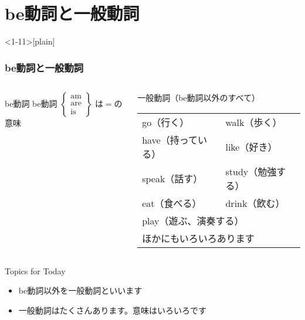 \documentclass[aspectratio=169]{beamer}
\begin{document}
\section{be動詞と一般動詞}
\begin{frame}<1-11>[plain]\frametitle{be動詞と一般動詞}

\begin{columns}
\begin{column}[t]{.38\textwidth}
\begin{block}{be動詞}
be動詞
{\footnotesize
$
 \left\{
\begin{array}{l}
\text{am}\\
\text{are}\\
\text{is}
\end{array}\right\}
$
}
は$=$の意味
\end{block}
\end{column}
\pause
\begin{column}[t]{.52\textwidth}
\begin{block}{一般動詞（be動詞以外のすべて）}
\begin{tabular}[t]{ll}
go（行く）&walk（歩く）\pause\\
have（持っている）&like（好き）\pause\\
speak（話す）&study（勉強する）\pause\\
eat（食べる）& drink（飲む）\pause\\
\multicolumn{2}{l}{play（遊ぶ、演奏する）\pause}\\
\multicolumn{2}{l}{ほかにもいろいろあります}\\
\end{tabular}

\end{block}
\end{column}
\end{columns}


\bigskip
\pause
\hyperlink{example}{}
\begin{exampleblock}{Topics for Today}
\begin{itemize}[<+- |alert@+>]
 \item  be動詞以外を一般動詞といいます
 \item 一般動詞はたくさんあります。意味はいろいろです
\end{itemize}
     \end{exampleblock}

\end{frame}
\end{document}
